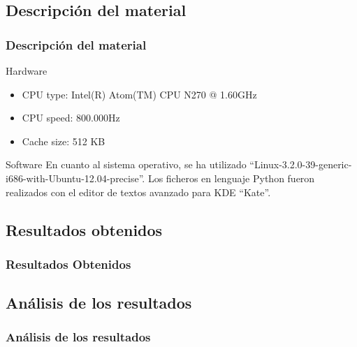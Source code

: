 \documentclass{beamer}
\begin{document}
\subsection{Descripción del material}

\begin{frame}

  \frametitle{Descripción del material}
  
  \begin{block}{Hardware}
    \begin{itemize}
      \item CPU type: Intel(R) Atom(TM) CPU N270   @ 1.60GHz
      \item CPU speed: 800.000Hz
      \item Cache size: 512 KB
    \end{itemize}
  \end{block}

  \begin{block}{Software}
    En cuanto al sistema operativo, se ha utilizado ``Linux-3.2.0-39-generic-i686-with-Ubuntu-12.04-precise''.
    Los ficheros en lenguaje Python fueron realizados con el editor de textos avanzado para KDE ``Kate''.
  \end{block}

\end{frame}

\subsection{Resultados obtenidos}

\begin{frame}
  
  \frametitle{Resultados Obtenidos}
  
  
  

\end{frame}

\subsection{Análisis de los resultados}

\begin{frame}

  \frametitle{Análisis de los resultados}
  
  
  
  
\end{frame}
\end{document}

